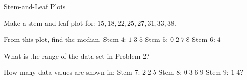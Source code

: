 \begin{practiceBox}{Stem-and-Leaf Plots}
\resetProblems

\prob Make a stem-and-leaf plot for: $15, 18, 22, 25, 27, 31, 33, 38$.

\prob From this plot, find the median. Stem $4$: $1\;3\;5$ \; Stem $5$: $0\;2\;7\;8$ \; Stem $6$: $4$

\prob What is the range of the data set in Problem 2?

\prob How many data values are shown in: Stem $7$: $2\;2\;5$ \; Stem $8$: $0\;3\;6\;9$ \; Stem $9$: $1\;4$?


\end{practiceBox}
